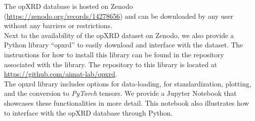 The opXRD database is hosted on Zenodo (\url{https://zenodo.org/records/14278656}) and can be downloaded by any user without any barriers or restrictions.
\\

Next to the availability of the opXRD dataset on Zenodo, we also provide a Python library ``opxrd'' to easily download and interface with the dataset. The instructions for how to install this library can be found in the repository associated with the library. The repository to this library is located at \url{https://github.com/aimat-lab/opxrd}. \\

The opxrd library includes options for data-loading, for standardization, plotting, and the conversion to \emph{PyTorch} tensors. We provide a Jupyter Notebook %
that showcases these functionalities in more detail. This notebook also illustrates how to interface with the opXRD database through Python. 